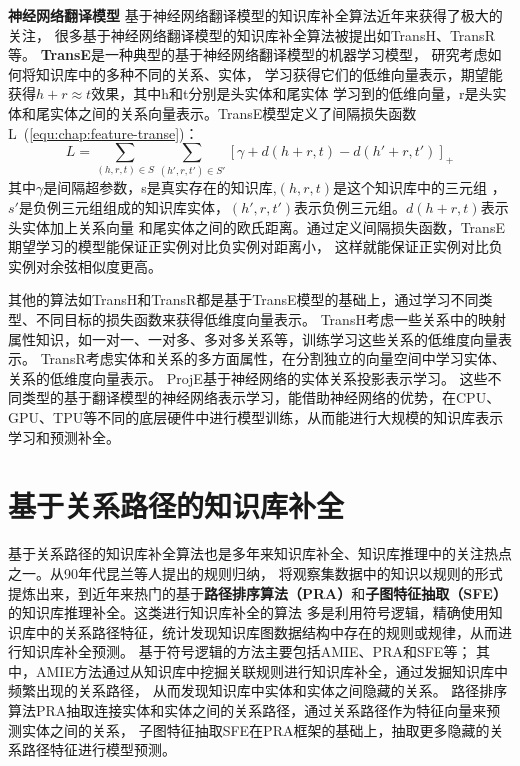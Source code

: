\textbf{神经网络翻译模型} 基于神经网络翻译模型的知识库补全算法近年来获得了极大的关注，
很多基于神经网络翻译模型的知识库补全算法被提出如TransH、TransR等。
\textbf{TransE}是一种典型的基于神经网络翻译模型的机器学习模型，
研究考虑如何将知识库中的多种不同的关系、实体，
学习获得它们的低维向量表示，期望能获得$h+r\approx t$效果，其中h和t分别是头实体和尾实体
学习到的低维向量，r是头实体和尾实体之间的关系向量表示。TransE模型定义了间隔损失函数L~(\ref{equ:chap:feature-transe})：
\begin{equation}
\label{equ:chap:feature-transe}
L=\sum_{(h,r,t)\in S} \sum_{(h',r,t')\in S'}[\gamma+d(h+r,t)-d(h'+r,t')]_{+}
\end{equation}
其中$\gamma$是间隔超参数，s是真实存在的知识库,$(h,r,t)$是这个知识库中的三元组
，$s'$是负例三元组组成的知识库实体，$(h',r,t')$表示负例三元组。$d(h+r,t)$表示头实体加上关系向量
和尾实体之间的欧氏距离。通过定义间隔损失函数，TransE期望学习的模型能保证正实例对比负实例对距离小，
这样就能保证正实例对比负实例对余弦相似度更高。

其他的算法如TransH和TransR都是基于TransE模型的基础上，通过学习不同类型、不同目标的损失函数来获得低维度向量表示。
TransH考虑一些关系中的映射属性知识，如一对一、一对多、多对多关系等，训练学习这些关系的低维度向量表示。
TransR\cite{Lin2015LearningEA}考虑实体和关系的多方面属性，在分割独立的向量空间中学习实体、关系的低维度向量表示。
ProjE\cite{Shi2017ProjEEP}基于神经网络的实体关系投影表示学习。
这些不同类型的基于翻译模型的神经网络表示学习，能借助神经网络的优势，在CPU、GPU、TPU等不同的底层硬件中进行模型训练，从而能进行大规模的知识库表示学习和预测补全。

\section{基于关系路径的知识库补全}
\label{cha:symbolic}

基于关系路径的知识库补全算法也是多年来知识库补全、知识库推理中的关注热点之一。从90年代昆兰等人提出的规则归纳，
将观察集数据中的知识以规则的形式提炼出来，到近年来热门的基于\textbf{路径排序算法（PRA）}和\textbf{子图特征抽取（SFE）}的知识库推理补全。这类进行知识库补全的算法
多是利用符号逻辑，精确使用知识库中的关系路径特征，统计发现知识库图数据结构中存在的规则或规律，从而进行知识库补全预测。
基于符号逻辑的方法主要包括AMIE\cite{Galrraga2013AMIEAR}、PRA\cite{Lao2010}和SFE\cite{Gardner2015}等；
其中，AMIE方法通过从知识库中挖掘关联规则进行知识库补全，通过发掘知识库中频繁出现的关系路径，
从而发现知识库中实体和实体之间隐藏的关系。
路径排序算法PRA抽取连接实体和实体之间的关系路径，通过关系路径作为特征向量来预测实体之间的关系，
子图特征抽取SFE在PRA框架的基础上，抽取更多隐藏的关系路径特征进行模型预测。

